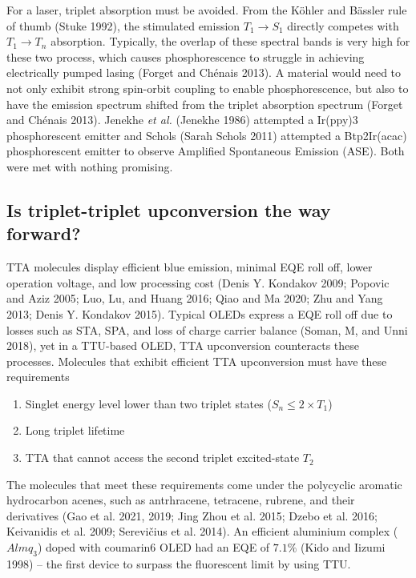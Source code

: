 \documentclass[
  letterpaper,
  DIV=11,
  numbers=noendperiod,
  oneside]{scrreprt}
\begin{document}
For a laser, triplet absorption must be avoided. From the Köhler and
Bässler rule of thumb (Stuke 1992), the stimulated emission
\(T_1 \rightarrow S_1\) directly competes with \(T_1 \rightarrow T_n\)
absorption. Typically, the overlap of these spectral bands is very high
for these two process, which causes phosphorescence to struggle in
achieving electrically pumped lasing (Forget and Chénais 2013). A
material would need to not only exhibit strong spin-orbit coupling to
enable phosphorescence, but also to have the emission spectrum shifted
from the triplet absorption spectrum (Forget and Chénais 2013). Jenekhe
\emph{et al.} (Jenekhe 1986) attempted a Ir(ppy)3 phosphorescent emitter
and Schols (Sarah Schols 2011) attempted a Btp2Ir(acac) phosphorescent
emitter to observe Amplified Spontaneous Emission (ASE). Both were met
with nothing promising.

\hypertarget{is-triplet-triplet-upconversion-the-way-forward}{%
\subsection{Is triplet-triplet upconversion the way
forward?}\label{is-triplet-triplet-upconversion-the-way-forward}}

TTA molecules display efficient blue emission, minimal EQE roll off,
lower operation voltage, and low processing cost (Denis Y. Kondakov
2009; Popovic and Aziz 2005; Luo, Lu, and Huang 2016; Qiao and Ma 2020;
Zhu and Yang 2013; Denis Y. Kondakov 2015). Typical OLEDs express a EQE
roll off due to losses such as STA, SPA, and loss of charge carrier
balance (Soman, M, and Unni 2018), yet in a TTU-based OLED, TTA
upconversion counteracts these processes. Molecules that exhibit
efficient TTA upconversion must have these requirements

\begin{enumerate}
\def\labelenumi{\arabic{enumi}.}
\item
  Singlet energy level lower than two triplet states
  (\(S_n \leq 2 \times T_1\))
\item
  Long triplet lifetime
\item
  TTA that cannot access the second triplet excited-state \(T_2\)
\end{enumerate}

The molecules that meet these requirements come under the polycyclic
aromatic hydrocarbon acenes, such as antrhracene, tetracene, rubrene,
and their derivatives (Gao et al. 2021, 2019; Jing Zhou et al. 2015;
Dzebo et al. 2016; Keivanidis et al. 2009; Serevičius et al. 2014). An
efficient aluminium complex (\(Almq_3\)) doped with coumarin6 OLED had
an EQE of \(7.1\%\) (Kido and Iizumi 1998) -- the first device to
surpass the fluorescent limit by using TTU.
\end{document}
